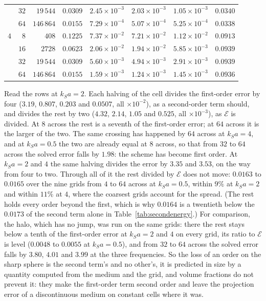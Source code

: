 \documentclass[11pt,a4paper]{article}
\newcommand{\cE}{\mathcal{E}}
\begin{document}
\begin{table}[htbp]
\begin{tabular}{@{}lrrcllll@{}}
      & $32$ & $19\,544$  & $0.0309$ & $2.45\times10^{-3}$ & $2.03\times10^{-3}$ & $1.05\times10^{-3}$ & $0.0340$ \\
      & $64$ & $146\,864$ & $0.0155$ & $7.29\times10^{-4}$ & $5.07\times10^{-4}$ & $5.25\times10^{-4}$ & $0.0338$ \\
\midrule
$4$   & $8$  & $408$      & $0.1225$ & $7.37\times10^{-2}$ & $7.21\times10^{-2}$ & $1.12\times10^{-2}$ & $0.0913$ \\
      & $16$ & $2728$     & $0.0623$ & $2.06\times10^{-2}$ & $1.94\times10^{-2}$ & $5.85\times10^{-3}$ & $0.0939$ \\
      & $32$ & $19\,544$  & $0.0309$ & $5.60\times10^{-3}$ & $4.94\times10^{-3}$ & $2.91\times10^{-3}$ & $0.0939$ \\
      & $64$ & $146\,864$ & $0.0155$ & $1.59\times10^{-3}$ & $1.24\times10^{-3}$ & $1.45\times10^{-3}$ & $0.0936$ \\
\bottomrule
\end{tabular}
\end{table}

Read the rows at $k_Sa=2$. Each halving of the cell divides the first-order error by four ($3.19$, $0.807$,
$0.203$ and $0.0507$, all $\times10^{-2}$), as a second-order term should, and divides the rest by two
($4.32$, $2.14$, $1.05$ and $0.525$, all $\times10^{-3}$), as $\cE$ is divided. At $8$ across the rest
is a seventh of the first-order error; at $64$ across it is the larger of the two. The same crossing has
happened by $64$ across at $k_Sa=4$, and at $k_Sa=0.5$ the two are already equal at $8$ across, so that
from $32$ to $64$ across the solved error falls by $1.98$: the scheme has become first order. At $k_Sa=2$ and $4$ the same halving
divides the error by $3.35$ and $3.53$, on the way from four to two. Through all of it the rest divided
by $\cE$ does not move: $0.0163$ to $0.0165$ over the nine grids from $4$ to $64$ across at $k_Sa=0.5$,
within $9\%$ at $k_Sa=2$ and within $11\%$ at $4$, where the coarsest grids account for the spread. (The
rest holds every order beyond the first, which is why $0.0164$ is a twentieth below the $0.0173$ of the
second term alone in Table~\ref{tab:secondenergy}.) For comparison, the halo, which has no jump, was run
on the same grids: there the rest stays below a tenth of the first-order error at $k_Sa=2$ and $4$
on every grid, its ratio to $\cE$ is level ($0.0048$ to $0.0055$ at $k_Sa=0.5$), and from $32$ to $64$
across the solved error falls by $3.80$, $4.01$ and $3.99$ at the three frequencies. So the loss of an order on the sharp sphere is
the second term's and no other's, it is predicted in size by a quantity computed from the medium and the
grid, and volume fractions do not prevent it: they make the first-order term second order and leave the
projection error of a discontinuous medium on constant cells where it was.
\end{document}
